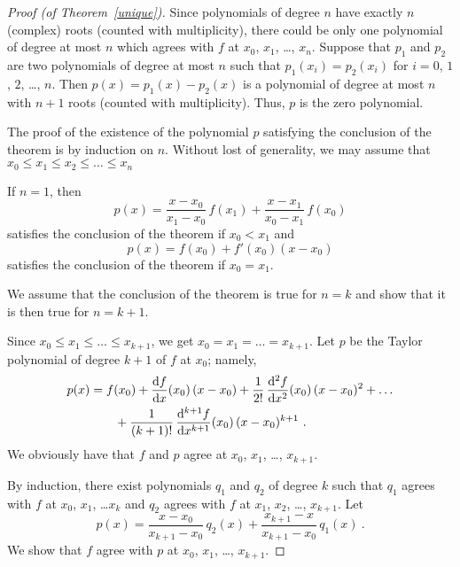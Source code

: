 \begin{proof}[Proof (of Theorem~\ref{unique})]
Since polynomials of degree $n$ have exactly $n$ (complex) roots
(counted with multiplicity), there could be only one polynomial of
degree at most $n$ which agrees with $f$ at $x_0$, $x_1$, \ldots,
$x_n$.  Suppose that $p_1$ and $p_2$ are two polynomials of degree at
most $n$ such that $p_1(x_i)=p_2(x_i)$ for $i=0$, $1$, $2$, \ldots, $n$.
Then $p(x) = p_1(x) - p_2(x)$ is a polynomial of degree at most $n$
with $n+1$ roots (counted with multiplicity).  Thus, $p$ is the zero
polynomial.

The proof of the existence of the polynomial $p$ satisfying the
conclusion of the theorem is by induction on $n$.  Without lost of
generality, we may assume that
$x_0 \leq x_1 \leq x_2 \leq \ldots \leq x_n$

If $n=1$, then
\[
p(x) = \frac{x-x_0}{x_1-x_0}\, f(x_1) +
\frac{x-x_1}{x_0-x_1}\,f(x_0)
\]
satisfies the conclusion of the theorem if $x_0 < x_1$ and
\[
p(x) = f(x_0) + f'(x_0)(x-x_0)
\]
satisfies the conclusion of the theorem if $x_0 = x_1$.

We assume that the conclusion of the theorem is true for $n=k$ and
show that it is then true for $n=k+1$.

  Since
$x_0 \leq x_1 \leq \ldots \leq x_{k+1}$,
we get $x_0 = x_1 = \ldots = x_{k+1}$.  Let $p$ be the Taylor
polynomial of degree $k+1$ of $f$ at $x_0$; namely,
\begin{equation}\label{badP}
\begin{split}
p(x) &= f(x_0) + \dydx{f}{x}(x_0)\,(x-x_0) +
\frac{1}{2!}\,\dydxn{f}{x}{2}(x_0)\,(x-x_0)^2
+ \ldots \\
& \qquad + \frac{1}{(k+1)!}\,\dydxn{f}{x}{k+1}(x_0)\,(x-x_0)^{k+1} \ .
\end{split}
\end{equation}
We obviously have that $f$ and $p$ agree at
$x_0$, $x_1$, \ldots, $x_{k+1}$.

  By induction, there exist
polynomials $q_1$ and $q_2$ of degree $k$ such that $q_1$ agrees with
$f$ at $x_0$, $x_1$, \ldots $x_k$ and $q_2$ agrees with $f$
at $x_1$, $x_2$, \ldots, $x_{k+1}$.  Let
\begin{equation}\label{goodP}
p(x) = \frac{x-x_0}{x_{k+1}-x_0}\,q_2(x) +
\frac{x_{k+1}-x}{x_{k+1}-x_0}\, q_1(x) \ .
\end{equation}
We show that $f$ agree with $p$ at $x_0$, $x_1$, \ldots, $x_{k+1}$.


\end{proof}
